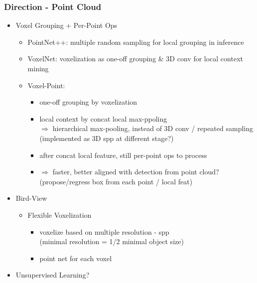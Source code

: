 \subsubsection{Direction - Point Cloud}
\begin{itemize}
\item Voxel Grouping + Per-Point Ops
	\begin{itemize}
	\item PointNet++: multiple random sampling for local grouping in inference
	\item VoxelNet: voxelization as one-off grouping \& 3D conv for local context mining
	\item Voxel-Point:
		\begin{itemize}
		\item one-off grouping by voxelization
		\item local context by concat local max-ppoling \\ 
		$\Rightarrow$ hierarchical max-pooling, instead of 3D conv / repeated sampling \\
		(implemented as 3D spp at different stage?)
		\item after concat local feature, still per-point ops to process
		\item $\Rightarrow$ faster, better aligned with detection from point cloud? \\
		(propose/regress box from each point / local feat)
		\end{itemize}
	\end{itemize}
\item Bird-View
	\begin{itemize}
	\item Flexible Voxelization
		\begin{itemize}
		\item voxelize based on multiple resolution - spp \\
		(minimal resolution = 1/2 minimal object size)
		\item point net for each voxel
		\end{itemize}
	\end{itemize}
\item Unsupervised Learning?
\end{itemize}

